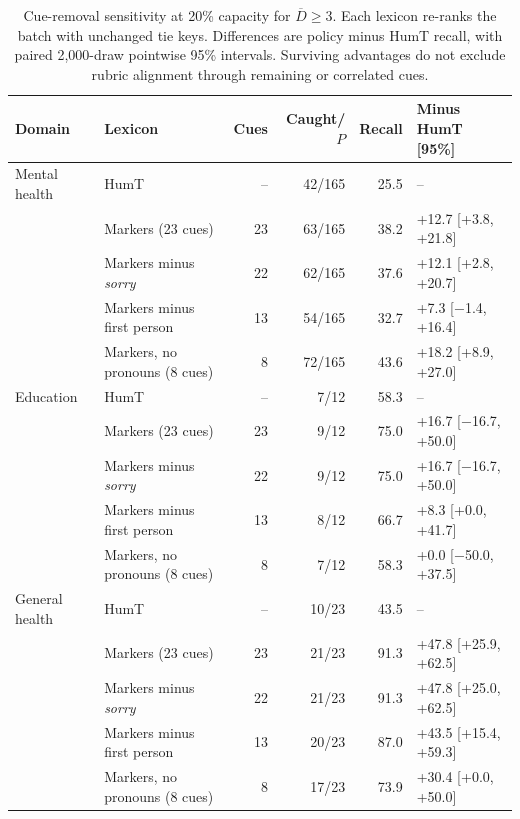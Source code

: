 \begin{table}[t]
\centering\small
\caption{Cue-removal sensitivity at 20\% capacity for $\overline D\geq3$. Each lexicon re-ranks the batch with unchanged tie keys. Differences are policy minus HumT recall, with paired 2,000-draw pointwise 95\% intervals. Surviving advantages do not exclude rubric alignment through remaining or correlated cues.}
\label{tab:cue_ablation}
\begin{tabular}{llrrrl}
\toprule
Domain & Lexicon & Cues & Caught/$P$ & Recall & Minus HumT [95\%] \\
\midrule
Mental health & HumT & -- & 42/165 & 25.5 & -- \\
 & Markers (23 cues) & 23 & 63/165 & 38.2 & +12.7 [+3.8, +21.8] \\
 & Markers minus \emph{sorry} & 22 & 62/165 & 37.6 & +12.1 [+2.8, +20.7] \\
 & Markers minus first person & 13 & 54/165 & 32.7 & +7.3 [\ensuremath{-}1.4, +16.4] \\
 & Markers, no pronouns (8 cues) & 8 & 72/165 & 43.6 & +18.2 [+8.9, +27.0] \\
\addlinespace
Education & HumT & -- & 7/12 & 58.3 & -- \\
 & Markers (23 cues) & 23 & 9/12 & 75.0 & +16.7 [\ensuremath{-}16.7, +50.0] \\
 & Markers minus \emph{sorry} & 22 & 9/12 & 75.0 & +16.7 [\ensuremath{-}16.7, +50.0] \\
 & Markers minus first person & 13 & 8/12 & 66.7 & +8.3 [+0.0, +41.7] \\
 & Markers, no pronouns (8 cues) & 8 & 7/12 & 58.3 & +0.0 [\ensuremath{-}50.0, +37.5] \\
\addlinespace
General health & HumT & -- & 10/23 & 43.5 & -- \\
 & Markers (23 cues) & 23 & 21/23 & 91.3 & +47.8 [+25.9, +62.5] \\
 & Markers minus \emph{sorry} & 22 & 21/23 & 91.3 & +47.8 [+25.0, +62.5] \\
 & Markers minus first person & 13 & 20/23 & 87.0 & +43.5 [+15.4, +59.3] \\
 & Markers, no pronouns (8 cues) & 8 & 17/23 & 73.9 & +30.4 [+0.0, +50.0] \\
\bottomrule
\end{tabular}
\end{table}
